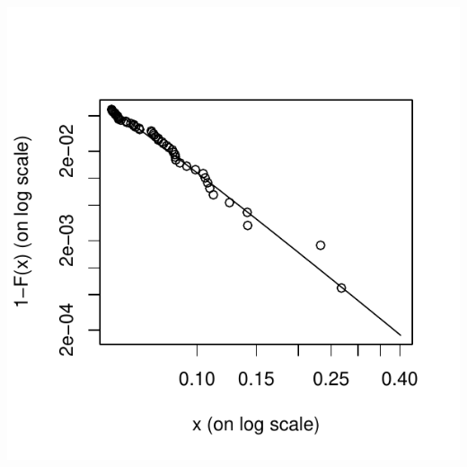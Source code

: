 \documentclass[10pt]{article}\usepackage[]{graphicx}\usepackage[]{color}
\makeatletter
\def\maxwidth{ %
  \ifdim\Gin@nat@width>\linewidth
    \linewidth
  \else
    \Gin@nat@width
  \fi
}
\newenvironment{knitrout}{}{} %
\makeatother
\begin{document}
\begin{knitrout}
{\centering \includegraphics[width=\maxwidth]{figure/unnamed-chunk-52} 

}



\end{knitrout}
\end{document}
